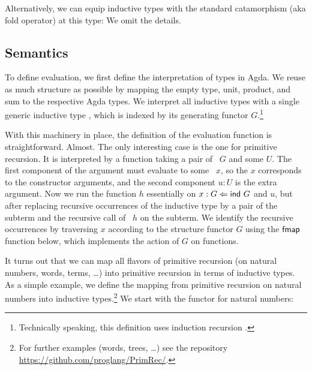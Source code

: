 \documentclass[a4paper,USenglish,cleveref, autoref, thm-restate]{lipics-v2021}
\begin{document}
Alternatively, we can equip inductive types with the standard
catamorphism (aka fold operator) at this type:
\ccDataPRF
We omit the details.

\subsection{Semantics}
\label{sec:semantics}


To define evaluation, we first define the interpretation of types in Agda.
\ccDataAlg
We reuse as much structure as possible by mapping the empty type, unit, product, and
sum to the respective Agda types. We interpret all inductive types with a
single generic inductive type , which is indexed by its generating
functor $G$.\footnote{Technically speaking, this definition uses
  induction recursion \cite{DBLP:journals/apal/DybjerS03}.}

With this machinery in place, the definition of the evaluation
function is straightforward. Almost.
\ccFunEval
The only interesting case is the one for primitive recursion. It is
interpreted by a function taking a pair of \Aind~$G$ and some $U$. The
first component of the argument must evaluate to some \Afold~$x$, so the $x$ corresponds
to the constructor arguments, and the second component $u:U$ is the
extra argument. Now we run the function $h$ essentially on
$x :{} G \Leftarrow \Aind~G$ and $u$, but 
after replacing recursive occurrences of the inductive type by a pair
of the subterm and the recursive call of {\AP}~$h$ on the subterm. We
identify the recursive occurrences by traversing $x$ according to the
structure functor $G$ using the $\Afmap$ function below, which
implements the action of $G$ on functions. 
\ccFunFmapSignature
\vspace{-1.5\baselineskip}
\ccFunFmap

It turns out that we can map all flavors of primitive recursion (on
natural numbers, words, terms, \dots) into primitive recursion in terms
of inductive types.
As a simple example, we define the mapping from primitive recursion on
natural numbers into inductive types.\footnote{For further examples
  (words, trees, \dots)
  see the repository \url{https://github.com/proglang/PrimRec/}.} We
start with the functor {\AGNat} for natural numbers:
\ccDefGNat
\end{document}
